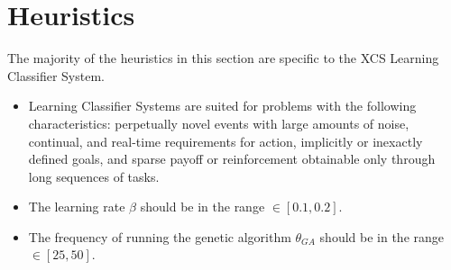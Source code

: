 \documentclass[a4paper, 11pt]{article}
\begin{document}
\section{Heuristics}
\label{sec:heuristics}
The majority of the heuristics in this section are specific to the XCS Learning Classifier System.

\begin{itemize}
	\item Learning Classifier Systems are suited for problems with the following characteristics: perpetually novel events with large amounts of noise, continual, and real-time requirements for action, implicitly or inexactly defined goals, and sparse payoff or reinforcement obtainable only through long sequences of tasks.
	\item The learning rate $\beta$ should be in the range $\in [0.1,0.2]$.
	\item The frequency of running the genetic algorithm $\theta_{GA}$ should be in the range $\in [25,50]$.
	
	
\end{itemize}

\end{document}
